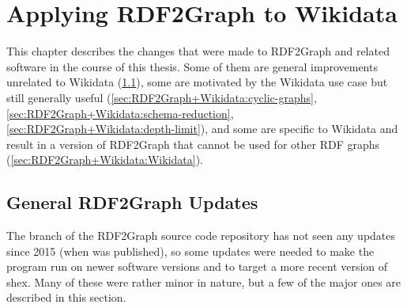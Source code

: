 
\chapter{Applying RDF2Graph to Wikidata}
\label{ch:RDF2Graph+Wikidata}

This chapter describes the changes that were made to RDF2Graph and related software in the course of this thesis.
Some of them are general improvements unrelated to Wikidata (\cref{sec:RDF2Graph+Wikidata:updates}),
some are motivated by the Wikidata use case but still generally useful (\cref{sec:RDF2Graph+Wikidata:cyclic-graphs}, \cref{sec:RDF2Graph+Wikidata:schema-reduction}, \cref{sec:RDF2Graph+Wikidata:depth-limit}),
and some are specific to Wikidata and result in a version of RDF2Graph
that cannot be used for other RDF graphs (\cref{sec:RDF2Graph+Wikidata:Wikidata}).

\section{General RDF2Graph Updates}
\label{sec:RDF2Graph+Wikidata:updates}

The  branch of the RDF2Graph source code repository
has not seen any updates since 2015 (when \cite{vanDam2015} was published), %
so some updates were needed to make the program run on newer software versions
and to target a more recent version of \gls{shex}.
Many of these were rather minor in nature,
but a few of the major ones are described in this section.

